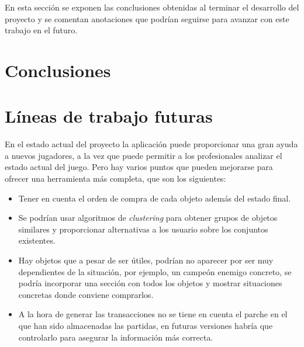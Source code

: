 
En esta sección se exponen las conclusiones obtenidas al terminar el desarrollo del proyecto y se comentan anotaciones que podrían seguirse para avanzar con este trabajo en el futuro.

\section{Conclusiones}


\section{Líneas de trabajo futuras}
En el estado actual del proyecto la aplicación puede proporcionar una gran ayuda a nuevos jugadores, a la vez que puede permitir a los profesionales analizar el estado actual del juego. Pero hay varios puntos que pueden mejorarse para ofrecer una herramienta más completa, que son los siguientes:
\begin{itemize}
	\item Tener en cuenta el orden de compra de cada objeto además del estado final.
	\item Se podrían usar algoritmos de \textit{clustering} para obtener grupos de objetos similares y proporcionar alternativas a los usuario sobre los conjuntos existentes.
	\item Hay objetos que a pesar de ser útiles, podrían no aparecer por ser muy dependientes de la situación, por ejemplo, un campeón enemigo concreto, se podría incorporar una sección con todos los objetos y mostrar situaciones concretas donde conviene comprarlos.
	\item A la hora de generar las transacciones no se tiene en cuenta el parche en el que han sido almacenadas las partidas, en futuras versiones habría que controlarlo para asegurar la información más correcta.
\end{itemize}